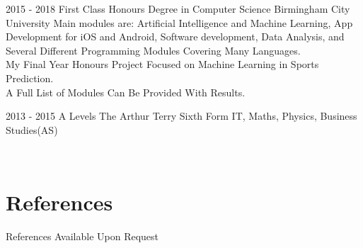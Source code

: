 \documentclass[]{friggeri-cv}
\begin{document}
\begin{entrylist}
  \entry
    {2015 - 2018}
    {First Class Honours Degree in Computer Science}
    {Birmingham City University}
    {Main modules are: Artificial Intelligence and Machine Learning, App Development for iOS and Android, Software development, Data Analysis, and Several Different Programming Modules Covering Many Languages.
    \\ My Final Year Honours Project Focused on Machine Learning in Sports Prediction. 
    \\ A Full List of Modules Can Be Provided With Results.\\}

    \entry
    {2013 - 2015}
    {A Levels}
    {The Arthur Terry Sixth Form}
    {IT, Maths, Physics, Business Studies(AS)\\}
\end{entrylist}
\\

\section{References}
References Available Upon Request
\\
\end{document}
